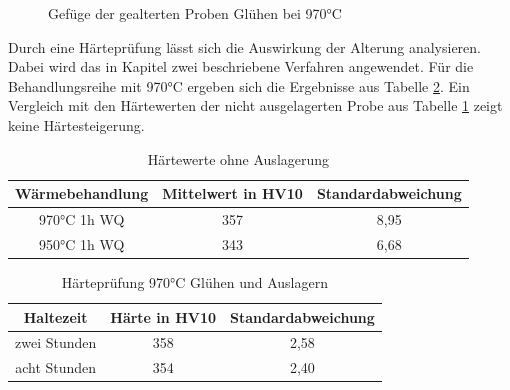 \documentclass[a4paper, 11pt]{tubsreprt}
\begin{document}
\begin{figure}
\caption{Gefüge der gealterten Proben Glühen bei 970°C}
\label{REM 970C auslagerung}
\end{figure}


Durch eine Härteprüfung lässt sich die Auswirkung der Alterung analysieren. Dabei wird das in Kapitel zwei beschriebene Verfahren angewendet. Für die Behandlungsreihe mit 970°C ergeben sich die Ergebnisse aus Tabelle \ref{heartepruefung970 inkl auslagern}. Ein Vergleich mit den Härtewerten der nicht ausgelagerten Probe aus Tabelle \ref{Hearte ohne Behandlung} zeigt keine Härtesteigerung. 

\begin{table}[t]	%
\begin{tabular}{c|c|c}
Wärmebehandlung & Mittelwert in HV10 & Standardabweichung \\
\hline 
970°C 1h WQ	& 357 & 8,95\\
\hline
950°C 1h WQ & 343 & 6,68 \\


\end{tabular}
\caption{Härtewerte ohne Auslagerung}
\label{Hearte ohne Behandlung}
\end{table}
\begin{table}[t] 	%
\begin{tabular}{c | c | c}
Haltezeit & Härte in HV10 & Standardabweichung \\
\hline
zwei Stunden & 358 & 2,58 \\
\hline
acht Stunden & 354 & 2,40 \\


\end{tabular}
\caption{Härteprüfung 970°C Glühen und Auslagern}
\label{heartepruefung970 inkl auslagern}
\end{table}
\newpage
\ \\
\newpage
\end{document}
